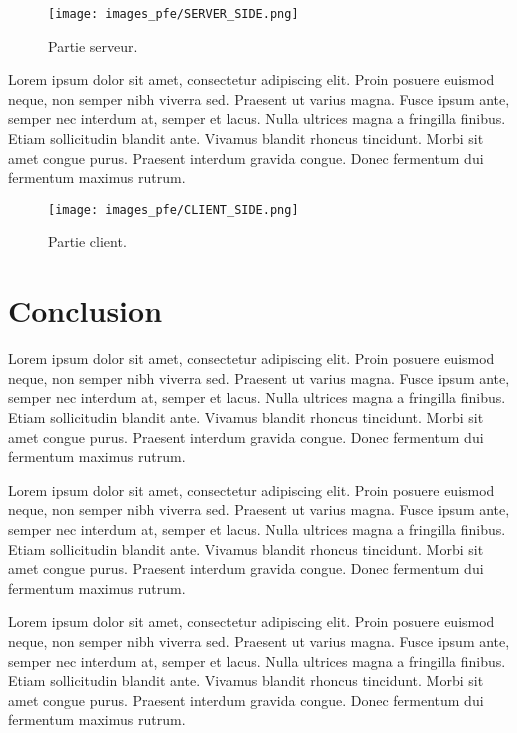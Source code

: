 \begin{figure}[hbt!]
  \centering
  \texttt{[image: images\_pfe/SERVER\_SIDE.png]}
  \caption{Partie serveur.}
  \label{fig:server-side}
\end{figure}
\FloatBarrier

\medskip

Lorem ipsum dolor sit amet, consectetur adipiscing elit. Proin posuere euismod neque, non semper nibh viverra sed. Praesent ut varius magna. Fusce ipsum ante, semper nec interdum at, semper et lacus. Nulla ultrices magna a fringilla finibus. Etiam sollicitudin blandit ante. Vivamus blandit rhoncus tincidunt. Morbi sit amet congue purus. Praesent interdum gravida congue. Donec fermentum dui fermentum maximus rutrum.

\begin{figure}[hbt!]
  \centering
  \texttt{[image: images\_pfe/CLIENT\_SIDE.png]}
  \caption{Partie client.}
  \label{fig:client-side}
\end{figure}
\FloatBarrier

\section{Conclusion}
Lorem ipsum dolor sit amet, consectetur adipiscing elit. Proin posuere euismod neque, non semper nibh viverra sed. Praesent ut varius magna. Fusce ipsum ante, semper nec interdum at, semper et lacus. Nulla ultrices magna a fringilla finibus. Etiam sollicitudin blandit ante. Vivamus blandit rhoncus tincidunt. Morbi sit amet congue purus. Praesent interdum gravida congue. Donec fermentum dui fermentum maximus rutrum.

Lorem ipsum dolor sit amet, consectetur adipiscing elit. Proin posuere euismod neque, non semper nibh viverra sed. Praesent ut varius magna. Fusce ipsum ante, semper nec interdum at, semper et lacus. Nulla ultrices magna a fringilla finibus. Etiam sollicitudin blandit ante. Vivamus blandit rhoncus tincidunt. Morbi sit amet congue purus. Praesent interdum gravida congue. Donec fermentum dui fermentum maximus rutrum.

Lorem ipsum dolor sit amet, consectetur adipiscing elit. Proin posuere euismod neque, non semper nibh viverra sed. Praesent ut varius magna. Fusce ipsum ante, semper nec interdum at, semper et lacus. Nulla ultrices magna a fringilla finibus. Etiam sollicitudin blandit ante. Vivamus blandit rhoncus tincidunt. Morbi sit amet congue purus. Praesent interdum gravida congue. Donec fermentum dui fermentum maximus rutrum.

